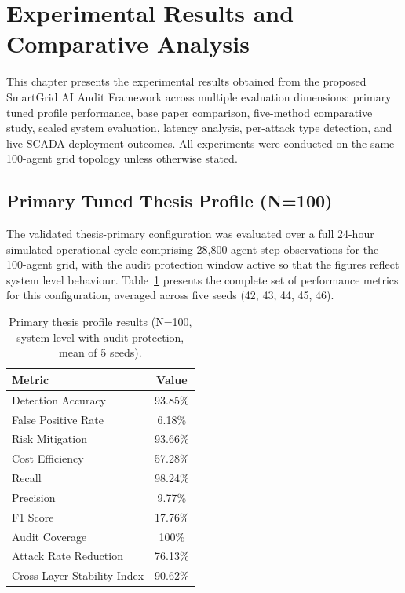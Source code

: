 
\section{Experimental Results and Comparative Analysis}

This chapter presents the experimental results obtained from the proposed SmartGrid AI Audit Framework across multiple evaluation dimensions: primary tuned profile performance, base paper comparison, five-method comparative study, scaled system evaluation, latency analysis, per-attack type detection, and live SCADA deployment outcomes. All experiments were conducted on the same 100-agent grid topology unless otherwise stated.


\subsection{Primary Tuned Thesis Profile (N=100)}

The validated thesis-primary configuration was evaluated over a full 24-hour simulated operational cycle comprising 28,800 agent-step observations for the 100-agent grid, with the audit protection window active so that the figures reflect system level behaviour. Table~\ref{tab:primary_profile} presents the complete set of performance metrics for this configuration, averaged across five seeds (42, 43, 44, 45, 46).

\begin{table}[H]
\centering
\caption{Primary thesis profile results (N=100, system level with audit protection, mean of 5 seeds).}
\label{tab:primary_profile}
\begin{tabular}{|l|c|}
\hline
\textbf{Metric} & \textbf{Value} \\ \hline
Detection Accuracy & 93.85\% \\ \hline
False Positive Rate & 6.18\% \\ \hline
Risk Mitigation & 93.66\% \\ \hline
Cost Efficiency & 57.28\% \\ \hline
Recall & 98.24\% \\ \hline
Precision & 9.77\% \\ \hline
F1 Score & 17.76\% \\ \hline
Audit Coverage & 100\% \\ \hline
Attack Rate Reduction & 76.13\% \\ \hline
Cross-Layer Stability Index & 90.62\% \\ \hline
\end{tabular}
\end{table}

